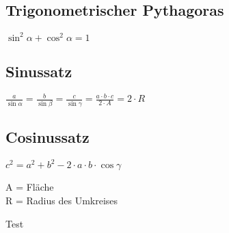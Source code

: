 	\subsection{Trigonometrischer Pythagoras}
		\begin{emphbox}
			$ \sin ^2 \alpha + \cos ^2 \alpha = 1 $
		\end{emphbox}
		
	\subsection{Sinussatz}
		\begin{emphbox}
			$ \frac{a}{\sin \alpha} = \frac{b}{\sin \beta} = \frac{c}{\sin \gamma} = \frac{a \cdot b \cdot c}{2 \cdot A} = 2 \cdot R$
		\end{emphbox}

	\subsection{Cosinussatz}
		\begin{emphbox}
			$ c^2 = a^2 + b^2 - 2 \cdot a \cdot b \cdot \cos \gamma $
		\end{emphbox}

\begin{symbolbox}
	A = Fläche\\
	R = Radius des Umkreises
\end{symbolbox}

\begin{bluebox}
	Test
\end{bluebox}




